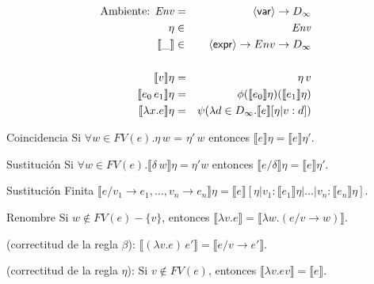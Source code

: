       \begin{eqnarray*}
        \text{Ambiente: } \mathit{Env} &=& \langle \mathsf{var} \rangle \to D_\infty \\
        \eta &\in& \mathit{Env} \\
        \llbracket\_\rrbracket &\in& \langle \mathsf{expr} \rangle \to  Env \to  D_\infty \\ \\
        \llbracket v\rrbracket\eta &=& \eta\, v \\
        \llbracket e_0\, e_1\rrbracket\eta &=& \phi(\llbracket e_0\rrbracket \eta) (\llbracket e_1\rrbracket\eta) \\
        \llbracket\lambda x.e\rrbracket\eta &=& \psi(\lambda d \in D_\infty. \llbracket e\rrbracket[\eta |v:d]) \\
      \end{eqnarray*}        
        
    \begin{theorem}{Coincidencia} Si $\forall w \in FV(e) . \eta\, w$ = $\eta'\, w$ entonces $\llbracket e\rrbracket \eta = \llbracket e\rrbracket \eta'$.
    \end{theorem}
        
    \begin{theorem}{Sustitución} Si $\forall w \in FV(e). \llbracket \delta\, w\rrbracket\eta = \eta' w$ entonces $\llbracket e/\delta\rrbracket \eta =\llbracket e\rrbracket\eta'$.
    \end{theorem}
    
    \begin{theorem}{Sustitución Finita} $\llbracket e/v_1\to e_1, \ldots,
      v_n\to e_n\rrbracket\eta = \llbracket e\rrbracket[\eta|v_1:
      \llbracket e_1\rrbracket\eta|\ldots|v_n:\llbracket e_n\rrbracket\eta]$.
    \end{theorem}
    
    \begin{theorem}{Renombre} Si $w \not\in FV(e)-\{v\}$, entonces
      $\llbracket\lambda v.e\rrbracket = \llbracket\lambda w.(e/v\to w)\rrbracket$.
    \end{theorem}
        
    \begin{property}(correctitud de la regla $\beta$): $\llbracket(\lambda v.e)\, e'\rrbracket = \llbracket e/v\to e'\rrbracket$.
    \end{property}
        
    \begin{property}
      (correctitud de la regla $\eta$): Si $v \not\in FV(e)$, entonces
      $\llbracket\lambda v.e v\rrbracket = \llbracket e\rrbracket$.
    \end{property}


